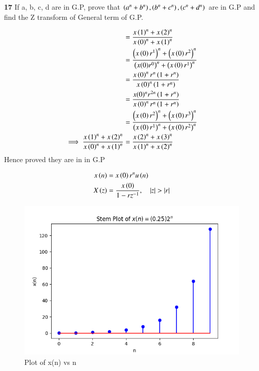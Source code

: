 \documentclass[journal,12pt,twocolumn]{IEEEtran}
\theoremstyle{remark}
\begin{document}


\vspace{3cm}

\title{}
\author{EE23BTECH11047 - Deepakreddy P
}
\maketitle
\newpage
\bigskip

\noindent \textbf{17} \quad 
If a, b, c, d are in G.P, prove that 
$ \left(a^{n} + b^{n}\right),\left(b^{n} + c^{n}\right),\left(c^{n} + d^{n}\right) $ are in G.P and find the Z transform of General term of G.P.\\
\solution

\begin{center}
    \begin{table}[ht]
        
    \end{table}
\end{center}

\begin{align} 
 &=\frac{x\left(1\right)^n + x\left(2\right)^n}{x\left(0\right)^n + x\left(1\right)^n}  \\
&= \frac{\left(x\left(0\right)r^1\right)^n + \left(x\left(0\right)r^2\right)^n}{\left(x(0)r^0\right)^n + \left(x\left(0\right)r^1\right)^n}\\
&= \frac{x\left(0\right)^n r^n \left(1 + r^n\right)}{x\left(0\right)^n \left(1 + r^n\right)} \\
&= \frac{x(0)^n r^{2n} \left(1 + r^n\right)}{x\left(0\right)^n r^n \left(1 + r^n\right)}\\
&= \frac{\left(x\left(0\right) r^2\right)^n + \left(x\left(0\right) r^3\right)^n}{\left(x\left(0\right) r^1\right)^n + \left(x\left(0\right) r^2\right)^n}\\
\implies \frac{x\left(1\right)^n + x\left(2\right)^n}{x\left(0\right)^n + x\left(1\right)^n} &= \frac{x\left(2\right)^n + x\left(3\right)^n}{x\left(1\right)^n + x\left(2\right)^n}
\end{align}
Hence proved they are in in G.P

\begin{align}
    x\brak{n} &= x\brak{0}r^{n} u\brak{n}\\
    X\brak{z} &= \frac{x\brak{0}}{1-rz^{-1}}, \quad |z|>|r|
\end{align}
\newpage
\begin{figure}[h]
   \centering
   \includegraphics[width=1\columnwidth]{figs/gp.png}
   \caption{Plot of x(n) vs n}
   \label{fig: Stem plot of x(n)}
\end{figure}
\end{document}
